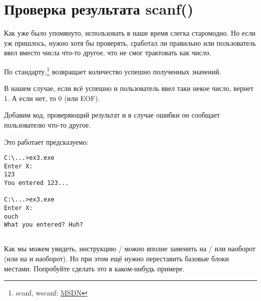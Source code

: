 \section{Проверка результата scanf()}

Как уже было упомянуто, использовать \scanf в наше время слегка старомодно. 
Но если уж пришлось, нужно хотя бы проверять, сработал ли \scanf 
правильно или пользователь ввел вместо числа что-то другое, что \scanf не смог трактовать как число.



По стандарту,\scanf\footnote{scanf, wscanf: \href{http://go.yurichev.com/17255}{MSDN}} возвращает количество успешно полученных значений.

В нашем случае, если всё успешно и пользователь ввел таки некое число, \scanf вернет 1. А если нет, то 0 (или \ac{EOF}).

Добавим код, проверяющий результат \scanf и в случае ошибки он сообщает пользователю что-то другое.

Это работает предсказуемо:

\begin{lstlisting}
C:\...>ex3.exe
Enter X:
123
You entered 123...

C:\...>ex3.exe
Enter X:
ouch
What you entered? Huh?
\end{lstlisting}






\subsection{\Exercise}

Как мы можем увидеть, инструкцию / можно вполне заменить на / или наоборот 
(или  на  и наоборот).
Но при этом ещё нужно переставить базовые блоки местами.
Попробуйте сделать это в каком-нибудь примере.
